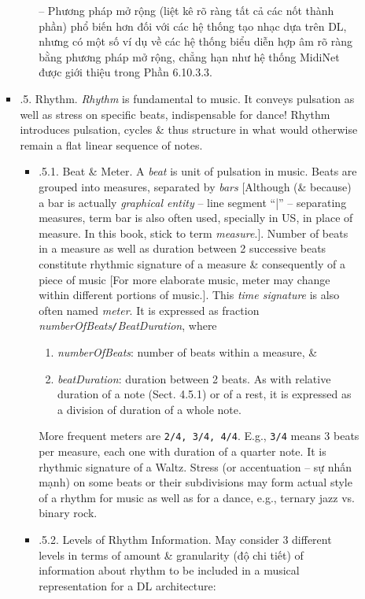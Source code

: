 \documentclass{article}
\begin{document}
\begin{itemize}
\begin{itemize}
\begin{itemize}
\begin{itemize}
				-- Phương pháp mở rộng (liệt kê rõ ràng tất cả các nốt thành phần) phổ biến hơn đối với các hệ thống tạo nhạc dựa trên DL, nhưng có một số ví dụ về các hệ thống biểu diễn hợp âm rõ ràng bằng phương pháp mở rộng, chẳng hạn như hệ thống MidiNet được giới thiệu trong Phần 6.10.3.3.
			\end{itemize}
			\item {.5. Rhythm.} {\it Rhythm} is fundamental to music. It conveys pulsation as well as stress on specific beats, indispensable for dance! Rhythm introduces pulsation, cycles \& thus structure in what would otherwise remain a flat linear sequence of notes.
			\begin{itemize}
				\item {.5.1. Beat \& Meter.} A {\it beat} is unit of pulsation in music. Beats are grouped into measures, separated by {\it bars} [Although (\& because) a bar is actually {\it graphical entity} -- line segment ``|'' -- separating measures, term bar is also often used, specially in US, in place of measure. In this book, stick to term {\it measure}.]. Number of beats in a measure as well as duration between 2 successive beats constitute rhythmic signature of a measure \& consequently of a piece of music [For more elaborate music, meter may change within different portions of music.]. This {\it time signature} is also often named {\it meter}. It is expressed as fraction {\it numberOfBeats{\tt/}BeatDuration}, where
				\begin{enumerate}
					\item {\it numberOfBeats}: number of beats within a measure, \&
					\item {\it beatDuration}: duration between 2 beats. As with relative duration of a note (Sect. 4.5.1) or of a rest, it is expressed as a division of duration of a whole note.
				\end{enumerate}
				More frequent meters are {\tt2/4, 3/4, 4/4}. E.g., {\tt3/4} means 3 beats per measure, each one with duration of a quarter note. It is rhythmic signature of a Waltz. Stress (or accentuation -- sự nhấn mạnh) on some beats or their subdivisions may form actual style of a rhythm for music as well as for a dance, e.g., ternary jazz vs. binary rock.
				\item {.5.2. Levels of Rhythm Information.} May consider 3 different levels in terms of amount \& granularity (độ chi tiết) of information about rhythm to be included in a musical representation for a DL architecture:
				\begin{enumerate}

\end{enumerate}
\end{itemize}
\end{itemize}
\end{itemize}
\end{itemize}
\end{document}
